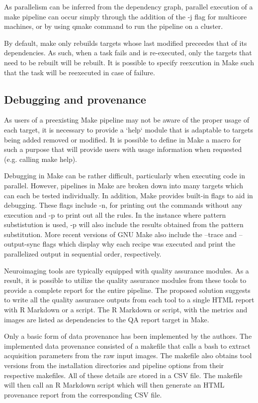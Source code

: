 \documentclass{report}
\begin{document}
        As parallelism can be inferred from the dependency graph, parallel execution of a make pipeline can occur simply through the
addition of the -j flag for multicore machines, or by using qmake command to run
the pipeline on a cluster.        

        By default, make only rebuilds targets whose last modified preceedes
that of its dependencies. As such, when a task fails and is re-executed, only the targets that need
to be rebuilt will be rebuilt. It is possible to specify reexcution in Make such
that the task will be reexecuted in case of failure.
 
        \subsection{Debugging and provenance}
        As users of a preexisting Make pipeline may not be aware of the proper
usage of each target, it is necessary to provide a `help` module that is
adaptable to targets being added removed or modified. It is possible to define
in Make a macro for such a purpose that will provide users with usage
information when requested (e.g. calling make help).

    Debugging in Make can be rather difficult, particularly when executing code
in parallel. However, pipelines in Make are broken down into many targets which
can each be tested individually. In addition, Make provides built-in flags to
aid in debugging. These flags include -n, for printing out the commands without
any execution and -p to print out all the rules. In the instance where pattern
substistution is used, -p will also include the results obtained from the
pattern substitution. More recent versions of GNU Make also include the --trace
and --output-sync flags which display why each recipe was executed and print the
parallelized output in sequential order, respectively.


    Neuroimaging tools are typically equipped with quality assurance modules. As
a result, it is possible to utilize the quality assurance modules from these
tools to provide a complete report for the entire pipeline. The proposed
solution suggests to write all the quality assurance outputs from each tool to a single HTML
report with R Markdown or a script. The R Markdown or script, with the metrics
and images are listed as dependencies to the QA report target in Make.


    Only a basic form of data provenance has been implemented by the authors.
The implemented data provenance consisted of a makefile that calls a bash to
extract acquisition parameters from the raw input images. The makefile also
obtains tool versions from the installation directories and pipeline options
from their respective makefiles. All of these details are stored in a CSV file.
The makefile will then call an R Markdown script which will then generate an
HTML provenance report from the corresponding CSV file.
         
\end{document}
